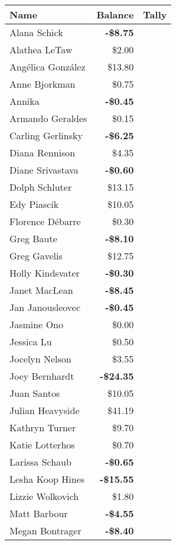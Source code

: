 \begin{tabularx}{\textwidth}{l>{\columncolor{vlightgray}}rX}
\toprule
\sc Name & \sc Balance &\sc Tally\\\toprule
Alana Schick & \textbf{-\$8.75} & \\\midrule
Alathea LeTaw & \$2.00 & \\\midrule
Ang\'elica Gonz\'alez & \$13.80 & \\\midrule
Anne Bjorkman & \$0.75 & \\\midrule
Annika & \textbf{-\$0.45} & \\\midrule
Armando Geraldes & \$0.15 & \\\midrule
Carling Gerlinsky & \textbf{-\$6.25} & \\\midrule
Diana Rennison & \$4.35 & \\\midrule
Diane Srivastava & \textbf{-\$0.60} & \\\midrule
Dolph Schluter & \$13.15 & \\\midrule
Edy Piascik & \$10.05 & \\\midrule
Florence D\'ebarre & \$0.30 & \\\midrule
Greg Baute & \textbf{-\$8.10} & \\\midrule
Greg Gavelis & \$12.75 & \\\midrule
Holly Kindsvater & \textbf{-\$0.30} & \\\midrule
Janet MacLean & \textbf{-\$8.45} & \\\midrule
Jan Janousleovec & \textbf{-\$0.45} & \\\midrule
Jasmine Ono & \$0.00 & \\\midrule
Jessica Lu & \$0.50 & \\\midrule
Jocelyn Nelson & \$3.55 & \\\midrule
Joey Bernhardt & \textbf{-\$24.35} & \\\midrule
Juan Santos & \$10.05 & \\\midrule
Julian Heavyside & \$41.19 & \\\midrule
Kathryn Turner & \$9.70 & \\\midrule
Katie Lotterhos & \$0.70 & \\\midrule
Larissa Schaub & \textbf{-\$0.65} & \\\midrule
Lesha Koop Hines & \textbf{-\$15.55} & \\\midrule
Lizzie Wolkovich & \$1.80 & \\\midrule
Matt Barbour & \textbf{-\$4.55} & \\\midrule
Megan Bontrager & \textbf{-\$8.40} & \\\midrule

\end{tabularx}
